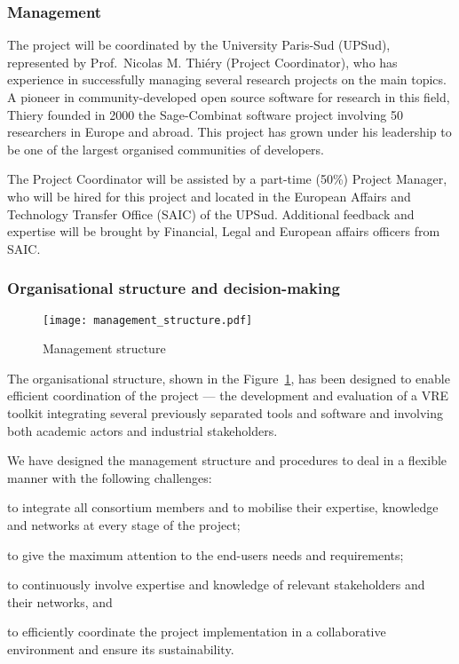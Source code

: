 \label{sect:mgt}

\subsubsection{Management}

The project will be coordinated by the University Paris-Sud (UPSud),
represented by Prof.~Nicolas M. Thiéry (Project Coordinator), who has
experience in successfully managing several research projects on the
main \TheProject topics.  A pioneer in community-developed open source
software for research in this field, Thiery founded in 2000 the
Sage-Combinat software project involving 50 researchers in Europe and
abroad.  This project has grown under his leadership to be one of the
largest organised communities of \Sage developers.

The Project Coordinator will be assisted by a part-time (50\%) Project
Manager, who will be hired for this project and located in the
European Affairs and Technology Transfer Office (SAIC) of the UPSud.
Additional feedback and expertise will be brought by Financial, Legal
and European affairs officers from SAIC.

\subsubsection{Organisational structure and decision-making}


\begin{figure}
  \centering
  \texttt{[image: management\_structure.pdf]}
  \caption{Management structure}
  \label{figure.management}
\end{figure}

The organisational structure, shown in the Figure~\ref{figure.management}, has been designed
to enable efficient coordination of the project --- the
development and evaluation of a VRE toolkit
integrating several previously separated tools and software and
involving both academic actors and industrial stakeholders.

We have designed the management structure and procedures to deal in a
flexible manner with the following challenges:

\begin{compactitem}
\item to integrate all consortium members and to mobilise their
  expertise, knowledge and networks at every stage of the project;
\item to give the maximum attention to the end-users needs and
  requirements;
\item to continuously involve expertise and knowledge of relevant
  stakeholders and their networks, and
\item to efficiently coordinate the project implementation in a
  collaborative environment and ensure its sustainability.
\end{compactitem}

